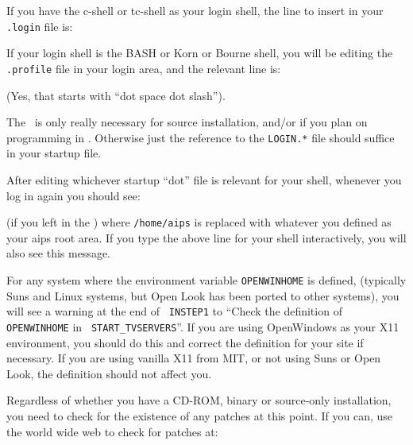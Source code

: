 If you have the c-shell or tc-shell as your login shell, the line to
insert in your {\tt .login} file is:\medskip

\medskip

\noindent If your login shell is the BASH or Korn or Bourne shell, you
will be editing the {\tt .profile} file in your login area, and the
relevant line is: \medskip

\medskip

\noindent (Yes, that starts with ``dot space dot slash'').

The \CDTST\ is only really necessary for source installation, and/or if
you plan on programming in \AIPS.  Otherwise just the reference to the
{\tt LOGIN.*} file should suffice in your startup file.

After editing whichever startup ``dot'' file is relevant for your shell,
whenever you log in again you should see:\medskip

\medskip

\noindent (if you left in the \CDTST) where {\tt /home/aips} is
replaced with whatever you defined as your aips root area.  If you type
the above line for your shell interactively, you will also see this
message.

\medskip{}

For any system where the environment variable {\tt OPENWINHOME} is
defined, (typically Suns and Linux systems, but Open Look has been
ported to other systems), you will see a warning at the end of {\tt
INSTEP1} to ``Check the definition of {\tt OPENWINHOME} in {\tt
START\_TVSERVERS}''.  If you are using OpenWindows as your X11
environment, you should do this and correct the definition for your site
if necessary.  If you are using vanilla X11 from MIT, or not using Suns
or Open Look, the definition should not affect you.

\medskip{}

Regardless of whether you have a CD-ROM, binary or source-only
installation, you need to check for the existence of any patches at this
point.
If you can, use the world wide web to check for patches at:\medskip

\medskip

